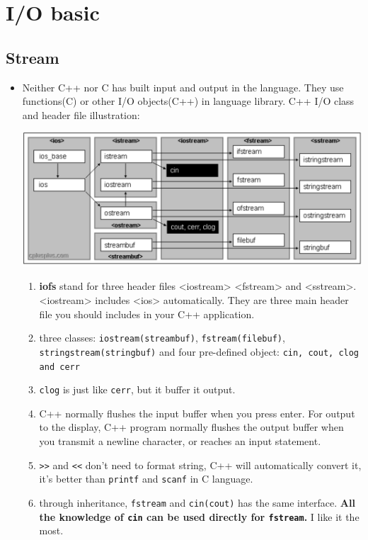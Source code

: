 \documentclass[a4paper,11pt,twoside]{book}
\begin{document}
\section{I/O basic}

\subsection{Stream}

\begin{itemize}
	\item Neither C++ nor C has built input and output in the language. They use functions(C) or other I/O objects(C++) in language library. C++ I/O class and header file illustration: 
	\begin{center}
			\includegraphics[scale=0.5]{pics/io.png}
	\end{center}

	\begin{enumerate}
		
		\item \textbf{iofs} stand for three header files <iostream> <fstream> and <sstream>. <iostream> includes <ios> automatically. They are three main header file you should includes in your C++ application.
		
		\item three classes: \texttt{iostream(streambuf)}, \texttt{fstream(filebuf)}, \texttt{stringstream(stringbuf)} and four pre-defined object: \texttt{cin, cout, clog and cerr} 
		
		\item \texttt{clog} is just like \texttt{cerr}, but it buffer it output.
		
		\item C++ normally flushes the input buffer when you press enter. For output to the display, C++ program normally flushes the output buffer when you transmit a newline character, or reaches an input statement.
		
		\item \verb=>>= and \verb=<<= don't need to format string,  C++ will automatically convert it, it's better than \texttt{printf} and \texttt{scanf} in C language.
		
		\item through inheritance, \texttt{fstream} and \texttt{cin(cout)} has the same interface. \textbf{All the knowledge of \texttt{cin} can be used directly for \texttt{fstream}.} I like it the most.
	\end{enumerate}
	
\end{itemize}
\end{document}
